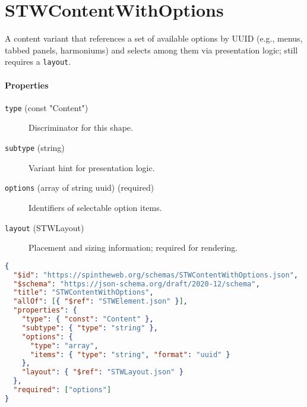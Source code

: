 \section{STWContentWithOptions}
A content variant that references a set of available options by UUID (e.g., menus, tabbed panels, harmoniums) and selects among them via presentation logic; still requires a \texttt{layout}.
\paragraph{Properties}
\begin{description}
  \item[\texttt{type} (const "Content")] Discriminator for this shape.
  \item[\texttt{subtype} (string)] Variant hint for presentation logic.
  \item[\texttt{options} (array of string uuid) (required)] Identifiers of selectable option items.
  \item[\texttt{layout} (STWLayout)] Placement and sizing information; required for rendering.
\end{description}
\begin{lstlisting}[language=JSON,caption={STWContentWithOptions Schema Definition}]
{
  "$id": "https://spintheweb.org/schemas/STWContentWithOptions.json",
  "$schema": "https://json-schema.org/draft/2020-12/schema",
  "title": "STWContentWithOptions",
  "allOf": [{ "$ref": "STWElement.json" }],
  "properties": {
    "type": { "const": "Content" },
    "subtype": { "type": "string" },
    "options": {
      "type": "array",
      "items": { "type": "string", "format": "uuid" }
    },
    "layout": { "$ref": "STWLayout.json" }
  },
  "required": ["options"]
}
\end{lstlisting}
